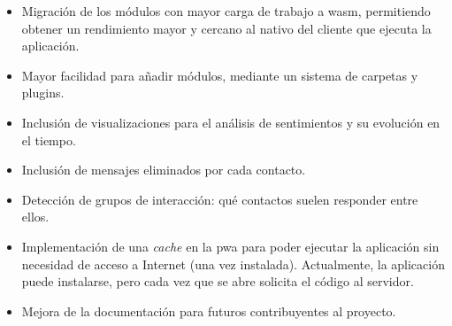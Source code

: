 \begin{itemize}

\item Migración de los módulos con mayor carga de trabajo a \acrfull{wasm}, permitiendo obtener un rendimiento mayor y cercano al nativo del cliente que ejecuta la aplicación.

\item Mayor facilidad para añadir módulos, mediante un sistema de carpetas y plugins.

\item Inclusión de visualizaciones para el análisis de sentimientos y su evolución en el tiempo.

\item Inclusión de mensajes eliminados por cada contacto.

\item Detección de grupos de interacción: qué contactos suelen responder entre ellos.

\item Implementación de una \textit{cache} en la \acrfull{pwa} para poder ejecutar la aplicación sin necesidad de acceso a Internet (una vez instalada). Actualmente, la aplicación puede instalarse, pero cada vez que se abre solicita el código al servidor.

\item Mejora de la documentación para futuros contribuyentes al proyecto.

\end{itemize}
